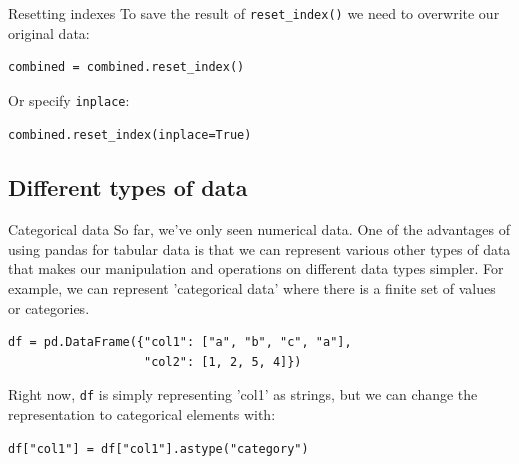 \documentclass[10pt]{beamer}
\begin{document}
\begin{frame}[label={sec:org1231002},fragile]{Resetting indexes}
 To save the result of \texttt{reset\_index()} we need to overwrite our original data:

\begin{verbatim}
combined = combined.reset_index()
\end{verbatim}

Or specify \texttt{inplace}:

\begin{verbatim}
combined.reset_index(inplace=True)
\end{verbatim}
\end{frame}

\subsection{Different types of data}
\label{sec:org5f58d05}

\begin{frame}[label={sec:org480cc39},fragile]{Categorical data}
 So far, we've only seen numerical data. One of the advantages of using pandas
for tabular data is that we can represent various other types of data that makes
our manipulation and operations on different data types simpler. For example, we
can represent 'categorical data' where there is a finite set of values or
categories.

\begin{verbatim}
df = pd.DataFrame({"col1": ["a", "b", "c", "a"],
                   "col2": [1, 2, 5, 4]})
\end{verbatim}

Right now, \texttt{df} is simply representing 'col1' as strings, but we can change the
representation to categorical elements with:

\begin{verbatim}
df["col1"] = df["col1"].astype("category")
\end{verbatim}
\end{frame}
\end{document}
